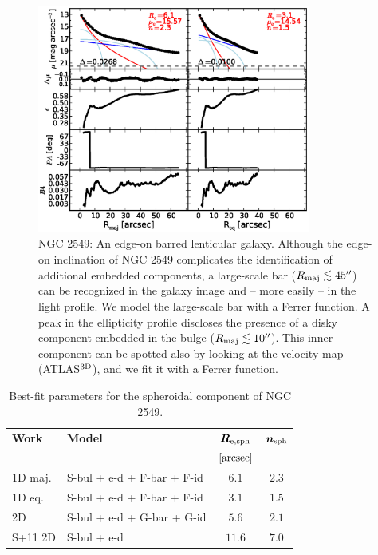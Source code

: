 \documentclass[preprint2]{emulateapj}
\newcommand{\fitfigurewidth}{0.8\textwidth}
\begin{document}
  \begin{figure}[h]
  \begin{center}
  \includegraphics[width=\fitfigurewidth]{n2549_1Dfit.eps}
  \caption{NGC 2549: 
  An edge-on barred lenticular galaxy. 
  Although the edge-on inclination of NGC 2549 complicates the identification of additional embedded components, 
  a large-scale bar ($R_{\rm maj} \lesssim 45''$) can be recognized in the galaxy image and -- more easily -- in the light profile.
  We model the large-scale bar with a Ferrer function.
  A peak in the ellipticity profile discloses the presence of a disky component
  embedded in the bulge ($R_{\rm maj} \lesssim 10''$).
  This inner component can be spotted also by looking at the velocity map (ATLAS$^{\rm 3D}$), and 
  we fit it with a Ferrer function.
  }
  \end{center}
  \end{figure}

  \begin{table}[h]
  \small
  \caption{Best-fit parameters for the spheroidal component of NGC 2549.}
  \begin{center}
  \begin{tabular}{llcc}
  \hline
  {\bf Work} & {\bf Model}   & $\bm R_{\rm e,sph}$    & $\bm n_{\rm sph}$ \\
    &  &  $[\rm arcsec]$ & \\
  \hline
  1D maj. & S-bul + e-d + F-bar + F-id & $6.1$  &  $2.3$ \\
  1D eq.  & S-bul + e-d + F-bar + F-id & $3.1$  &  $1.5$ \\
  2D      & S-bul + e-d + G-bar + G-id & $5.6$  &  $2.1$ \\
  \hline
  S+11 2D         & S-bul + e-d & $11.6$  &  $7.0$ \\
  \hline
  \end{tabular}
  \end{center}
  \label{tab:n2549}
  \end{table}
\end{document}
